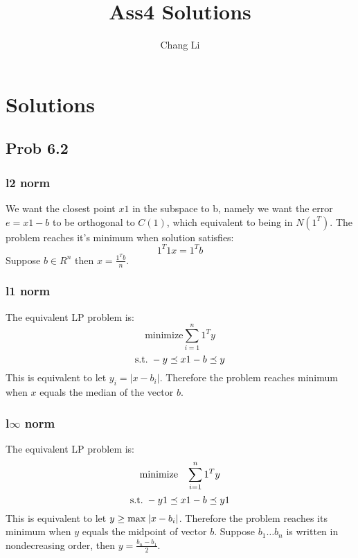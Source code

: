\documentclass[10pt,a4paper]{article}
\begin{document}
\title{Ass4 Solutions}
\author{Chang Li}
\maketitle

\section{Solutions}

\subsection{Prob 6.2}

\subsubsection{l2 norm}
We want the closest point $x1$ in the subspace to b, namely
we want the error $e = x1 - b$ to be orthogonal to $C(1)$,
which equivalent to being in $N(1^T)$. The problem reaches
it's minimum when solution satisfies:
$$
1^T1x=1^Tb
$$
Suppose $b\in R^n$ then $x=\frac{1^Tb}{n}$.

\subsubsection{l1 norm}
The equivalent LP problem is:
$$
\text{minimize} \sum_{i=1}^n 1^Ty
$$
$$
\text{s.t.\;}  -y \preceq x1-b \preceq y
$$
This is equivalent to let $y_i = |x - b_i|$. Therefore the problem
reaches minimum when $x$ equals the median of the vector $b$.



\subsubsection{l$\infty$ norm}

The equivalent LP problem is:
$$
\text{minimize \;\;}\sum_{i=1}^n 1^Ty
$$
$$
\text{s.t.\;}  -y1 \preceq x1-b \preceq y1
$$
This is equivalent to let $y \geq \text{max\;}|x - b_i|$.
Therefore the problem reaches its minimum when $y$ equals
the midpoint of vector $b$. Suppose $b_1 \dots b_n$ is
written in nondecreasing order, then $y=\frac{b_n-b_1}{2}$.
\end{document}
